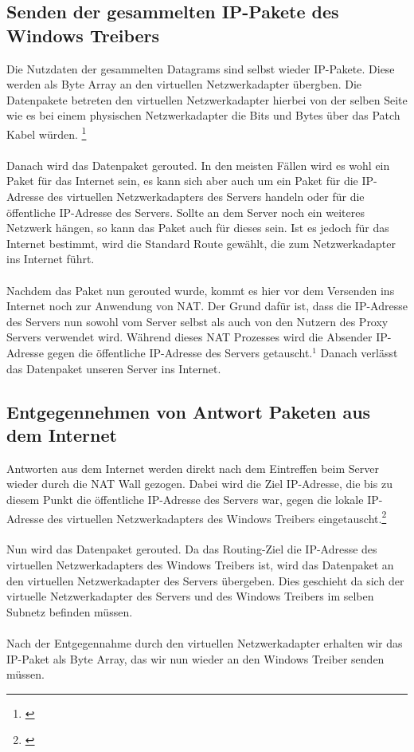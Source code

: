 \subsection{Senden der gesammelten IP-Pakete des Windows Treibers}
Die Nutzdaten der gesammelten Datagrams sind selbst wieder IP-Pakete. Diese werden als Byte Array an den virtuellen Netzwerkadapter übergben. Die Datenpakete betreten den virtuellen Netzwerkadapter hierbei von der selben Seite wie es bei einem physischen Netzwerkadapter die Bits und Bytes über das Patch Kabel würden. \footnote[4]{\cite[Vgl.][]{TUNTAP}} 
\\\\  
Danach wird das Datenpaket gerouted. In den meisten Fällen wird es wohl ein Paket für das Internet sein, es kann sich aber auch um ein Paket für die IP-Adresse des virtuellen Netzwerkadapters des Servers handeln oder für die öffentliche IP-Adresse des Servers. Sollte an dem Server noch ein weiteres Netzwerk hängen, so kann das Paket auch für dieses sein. Ist es jedoch für das Internet bestimmt, wird die Standard Route gewählt, die zum Netzwerkadapter ins Internet führt. 
\\\\
Nachdem das Paket nun gerouted wurde, kommt es hier vor dem Versenden ins Internet noch zur Anwendung von NAT. Der Grund dafür ist, dass die IP-Adresse des Servers nun sowohl vom Server selbst als auch von den Nutzern des Proxy Servers verwendet wird. Während dieses NAT Prozesses wird die Absender IP-Adresse gegen die öffentliche IP-Adresse des Servers getauscht.$^{1}$ Danach verlässt das Datenpaket unseren Server ins Internet.

\newpage
\subsection{Entgegennehmen von Antwort Paketen aus dem Internet}
Antworten aus dem Internet werden direkt nach dem Eintreffen beim Server wieder durch die NAT Wall gezogen. Dabei wird die Ziel IP-Adresse, die bis zu diesem Punkt die öffentliche IP-Adresse des Servers war, gegen die lokale IP-Adresse des virtuellen Netzwerkadapters des Windows Treibers eingetauscht.\footnote[1]{\cite[Vgl.][]{SRV5}}
\\\\ 
Nun wird das Datenpaket gerouted. Da das Routing-Ziel die IP-Adresse des virtuellen Netzwerkadapters des Windows Treibers ist, wird das Datenpaket an den virtuellen Netzwerkadapter des Servers übergeben. Dies geschieht da sich der virtuelle Netzwerkadapter des Servers und des Windows Treibers im selben Subnetz befinden müssen.  
\\\\
Nach der Entgegennahme durch den virtuellen Netzwerkadapter erhalten wir das IP-Paket als Byte Array, das wir nun wieder an den Windows Treiber senden müssen.

